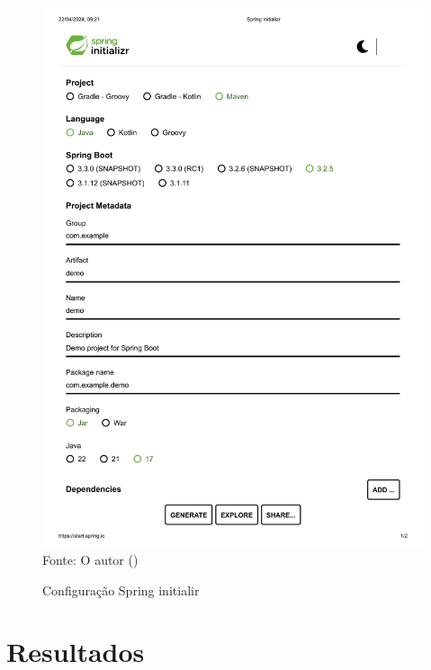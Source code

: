 \begin{figure}[H]
\center
  \caption{Configuração Spring initialir}
  \includegraphics[scale=0.6]{figure/Spring Initializr.pdf}
  \label{fig:spring}
  \flushleft %
    {\fontsize{10pt}{\baselineskip}\selectfont
    Fonte: O autor (\the\year) }
\end{figure}




\section{Resultados}







